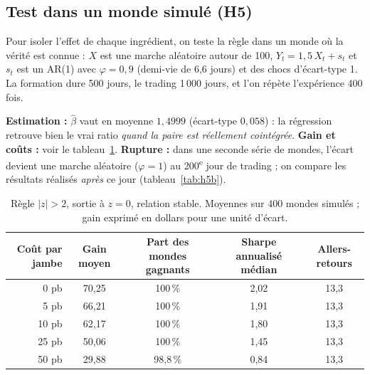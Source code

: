 \documentclass[11pt,a4paper]{article}
\begin{document}
\subsection{Test dans un monde simulé (H5)}

Pour isoler l'effet de chaque ingrédient, on teste la règle dans un monde où la vérité est connue : $X$ est une marche aléatoire autour de 100, $Y_t = 1{,}5\,X_t + s_t$ et $s_t$ est un AR(1) avec $\varphi = 0{,}9$ (demi-vie de 6,6 jours) et des chocs d'écart-type 1. La formation dure 500 jours, le trading 1\,000 jours, et l'on répète l'expérience 400 fois.

\begin{codebox}
\textbf{Estimation :} $\hat\beta$ vaut en moyenne $1{,}4999$ (écart-type $0{,}058$) : la régression retrouve bien le vrai ratio \emph{quand la paire est réellement cointégrée}. \textbf{Gain et coûts :} voir le tableau~\ref{tab:h5}. \textbf{Rupture :} dans une seconde série de mondes, l'écart devient une marche aléatoire ($\varphi = 1$) au 200\textsuperscript{e} jour de trading ; on compare les résultats réalisés \emph{après} ce jour (tableau~\ref{tab:h5b}).
\end{codebox}

\begin{table}[h]
\centering\small
\caption{Règle $|z|>2$, sortie à $z = 0$, relation stable. Moyennes sur 400 mondes simulés ; gain exprimé en dollars pour une unité d'écart.}
\label{tab:h5}
\begin{tabular}{rcccc}
\toprule
Coût par jambe & Gain moyen & Part des mondes gagnants & Sharpe annualisé médian & Allers-retours \\
\midrule
0 pb & 70,25 & 100\,\% & 2,02 & 13,3 \\
5 pb & 66,21 & 100\,\% & 1,91 & 13,3 \\
10 pb & 62,17 & 100\,\% & 1,80 & 13,3 \\
25 pb & 50,06 & 100\,\% & 1,45 & 13,3 \\
50 pb & 29,88 & 98,8\,\% & 0,84 & 13,3 \\
\bottomrule
\end{tabular}
\end{table}
\end{document}
